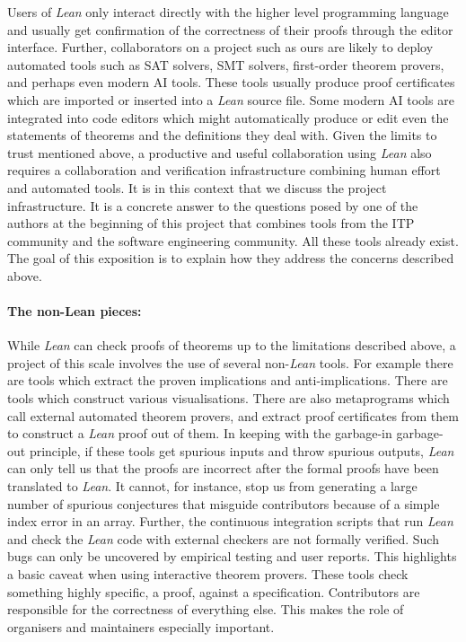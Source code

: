 \documentclass[12pt]{amsart}
\theoremstyle{definition}
\begin{document}
Users of \emph{Lean} only interact directly with the higher level programming language and usually get confirmation of the correctness of their proofs through the editor interface. Further, collaborators on a project such as ours are likely to deploy automated tools such as SAT solvers, SMT solvers, first-order theorem provers, and perhaps even modern AI tools. These tools usually produce proof certificates which are imported or inserted into a \emph{Lean} source file. Some modern AI tools are integrated into code editors which might automatically produce or edit even the statements of theorems and the definitions they deal with. Given the limits to trust mentioned above, a productive and useful collaboration using \emph{Lean} also requires a collaboration and verification infrastructure combining human effort and automated tools. It is in this context that we discuss the project infrastructure. It is a concrete answer to the questions posed by one of the authors at the beginning of this project \cite{Tao_blog_Sep_2024} that combines tools from the ITP community and the software engineering community. All these tools already exist. The goal of this exposition is to explain how they address the concerns described above.


\paragraph{\textbf{The non-Lean pieces:}} While \emph{Lean} can check proofs of theorems up to the limitations described above, a project of this scale involves the use of several non-\emph{Lean} tools. For example there are tools which extract the proven implications and anti-implications. There are tools which construct various visualisations. There are also metaprograms which call external automated theorem provers, and extract proof certificates from them to construct a \emph{Lean} proof out of them. In keeping with the garbage-in garbage-out principle, if these tools get spurious inputs and throw spurious outputs, \emph{Lean} can only tell us that the proofs are incorrect after the formal proofs have been translated to \emph{Lean}. It cannot, for instance, stop us from generating a large number of spurious conjectures that misguide contributors because of a simple index error in an array. Further, the continuous integration scripts that run \emph{Lean} and check the \emph{Lean} code with external checkers are not formally verified. Such bugs can only be uncovered by empirical testing and user reports. This highlights a basic caveat when using interactive theorem provers. These tools check something highly specific, a proof, against a specification. Contributors are responsible for the correctness of everything else. This makes the role of organisers and maintainers especially important.
\end{document}
